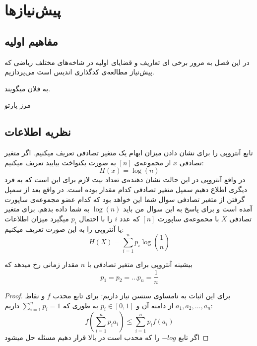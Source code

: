 \chapter{پیش‌نیازها}
\label{chapter:preliminaries}
\section{مفاهیم اولیه}

در این فصل به مرور برخی ای تعاریف و قضایای اولیه در شاخه‌های مختلف ریاضی که پیش‌نیاز مطالعه‌ی کدگذاری اندیس است می‌پردازیم.


\begin{definition}[
	کد
	\lr{mds}
	]
	\label{def:mds}
\end{definition}

\begin{definition}
	\label{def:Pareto}
    به فلان میگویند.

    مرز پارتو
    \label{def:Pareto-boundary}
\end{definition}

\section{
    ‌نظریه اطلاعات
}

تابع آنتروپی را برای نشان دادن میزان ابهام یک متغیر تصادفی تعریف میکنیم. اگر متغیر تصادفی
$x$
از مجموعه‌ی
$[n]$
به صورت یکنواخت بیایید تعریف میکنیم:
$$H(x) = \log(n)$$
در واقع آنتروپی در این حالت نشان دهنده‌ی تعداد بیت لازم برای این است که به فرد دیگری اطلاع دهیم سمپل متغیر تصادفی کدام مقدار بوده است. در واقع بعد از سمپل گرفتن از متغیر تصادفی سوال شما این خواهد بود که کدام عضو مجموعه‌ی ساپورت آمده است و برای پاسخ به این سوال من باید
$\log(n)$
به شما داده بدهم.
برای متغیر تصادفی
$X$
با محموعه‌ی ساپورت
$[n]$
که عدد
$i$
را با احتمال
$p_i$
میگیرد میزان اطلاعات یا آنتروپی را به این صورت تعریف میکنیم:
$$H(X) = \sum_{i = 1}^{n} p_i \log(\frac{1}{n})$$

\begin{theorem}
بیشینه آنتروپی برای متغیر تصادفی با
$n$
مقدار زمانی رخ میدهد که
$$p_1 = p_2 = \dots p_n = \frac{1}{n}$$
\end{theorem}
\begin{proof}
برای این اثبات به نامساوی سنسن نیاز داریم: برای تابع محدب
$f$
و نقاط
$a_1, a_2, \dots, a_n$
از دامنه آن و
$p_i \in [0, 1]$
به طوری که
$\sum_{i = 1}^{n} p_i = 1$
داریم:
$$f(\sum_{i = 1}^{n} p_i a_i) \leq \sum_{i = 1}^{n} p_i f(a_i)$$
اگر تابع
$- log$
را که محدب است در بالا قرار دهیم مسئله حل میشود
\end{proof}

